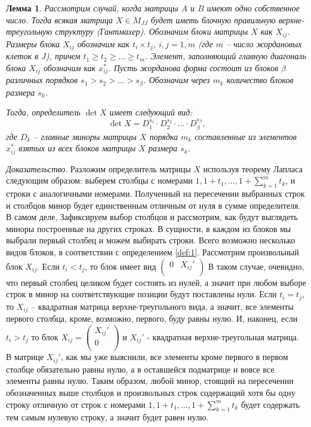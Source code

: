 \documentclass[11pt, a4paper]{article}
\newtheorem{lemm}{Лемма}
\begin{document}
\begin{lemm} \label{lemm:1}
    Рассмотрим случай, когда матрицы $A$ и $B$ имеют одно собственное число. Тогда всякая матрица
    $X \in M_{JJ}$ будет иметь блочную правильную верхне-треугольную структуру (Гантмахер). Обозначим блоки матрицы $X$ как
    $X_{ij}$. Размеры блока $X_{ij}$ обозначим как $t_i \times t_j$, $i, j = \overline{1, m}$ (где $m$ -- число жордановых клеток в $J$), причем
    $t_1 \geqslant t_2 \geqslant \ldots  \geqslant t_m$.
    Элемент, заполняющий главную диагональ блока $X_{ij}$ обозначим как $x^{\ast}_{ij}$.
    Пусть жорданова форма состоит из блоков $\beta$ различных порядков $s_1 > s_2 > \ldots > s_{\beta}$. Обозначим 
    через ${m_k}$ количество блоков размера $s_{k}$.

    Тогда, определитель $\det X$ имеет следующий вид:
    $$ \det X = D_{1}^{s_1} \cdot D_{2}^{s_2} \cdot \ldots \cdot D_{\beta}^{s_{\beta}}\text{,}$$
    где $D_{k}$ -- главные миноры матрицы $X$ порядка $m_{k}$ составленные из элементов $x^{\ast}_{ij}$ взятых из всех блоков матрицы 
    $X$ размера $s_{k}$.
\end{lemm}
\textit{Доказательство}.
Разложим определитель матрицы $X$ используя теорему Лапласа следующим образом: 
выберем столбцы с номерами $1, 1 + t_1, \dots, 1 + \displaystyle \sum_{k = 1}^{m}{t_k}$, и строки с аналогичными номерами. 
Полученный на пересечении выбранных строк и столбцов минор будет единственным отличным от нуля в сумме определителя. В самом деле,
Зафиксируем выбор столбцов и рассмотрим, как будут выглядеть миноры построенные на других строках. В сущности, в каждом из блоков мы 
выбрали первый столбец и можем выбирать строки. Всего возможно несколько видов блоков, в соответствии с определением \ref{def:1}. Рассмотрим
произвольный блок $X_{ij}$. Если $t_i < t_j$, то блок имеет вид $\left(\begin{matrix} 0 & X_{ij}'\\ \end{matrix}\right)$
В таком случае, очевидно, что первый столбец целиком будет состоять из нулей, а значит при любом выборе строк в минор на соответствующие позиции
будут поставлены нули. Если $t_i = t_j$, то $X_{ij}$ -- квадратная матрица верхне-треугольного вида, а значит, все элементы первого столбца, кроме, возможно, первого, 
буду равны нулю. И, наконец, если $t_i > t_j$ то блок $X_{ij} = \left(\begin{matrix} X_{ij}'\\ 0\\ \end{matrix}\right)$ и $X_{ij}'$ - квадратная верхне-треугольная матрица.
В матрице $X_{ij}'$, как мы уже выяснили, все элементы кроме первого в первом столбце обязательно равны нулю, а в оставшейся подматрице и вовсе
все элементы равны нулю. Таким образом, любой минор, стоящий на пересечении обозначенных выше столбцов и произвольных строк содержащий
хотя бы одну строку отличную от строк с номерами $1, 1 + t_1, \dots, 1 + \displaystyle \sum_{k = 1}^{m}{t_k}$ будет содержать тем самым
нулевую строку, а значит будет равен нулю.
\end{document}
